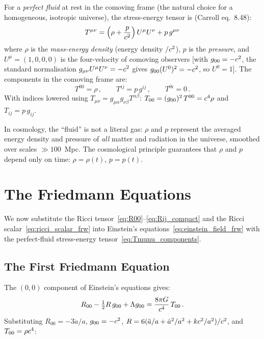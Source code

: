 For a \emph{perfect fluid} at rest in the comoving frame (the natural
choice for a homogeneous, isotropic universe), the stress-energy tensor
is (Carroll eq.~8.48):
\begin{equation}
    T^{\mu\nu} = \left(\rho + \frac{p}{c^2}\right)
    U^\mu U^\nu + p\, g^{\mu\nu}
    \label{eq:perfect_fluid_frw}
\end{equation}
where $\rho$ is the \emph{mass-energy density} (energy density
$/c^2$), $p$ is the \emph{pressure}, and
$U^\mu = (1, 0, 0, 0)$ is the four-velocity of comoving
observers [with $g_{00} = -c^2$, the standard
normalisation $g_{\mu\nu}U^\mu U^\nu = -c^2$ gives
$g_{00}(U^0)^2 = -c^2$, so $U^0 = 1$].
The components in the comoving frame are:
\begin{equation}
    T^{00} = \rho \,, \qquad
    T^{ij} = p\, g^{ij} \,, \qquad
    T^{0i} = 0 \,.
    \label{eq:Tmunu_components}
\end{equation}
With indices lowered using $T_{\mu\nu} = g_{\mu\alpha}g_{\nu\beta}T^{\alpha\beta}$:
$T_{00} = (g_{00})^2\,T^{00} = c^4\rho$ and
$T_{ij} = p\, g_{ij}$.

\begin{remark}
In cosmology, the ``fluid'' is not a literal gas: $\rho$ and $p$
represent the averaged energy density and pressure of \textit{all}
matter and radiation in the universe, smoothed over scales $\gg 100$~Mpc.
The cosmological principle guarantees that $\rho$ and $p$ depend only
on time: $\rho = \rho(t)$, $p = p(t)$.
\end{remark}


\section{The Friedmann Equations}
\label{sec:friedmann_equations}

We now substitute the Ricci tensor~\eqref{eq:R00}--\eqref{eq:Rij_compact}
and the Ricci scalar~\eqref{eq:ricci_scalar_frw} into Einstein's
equations~\eqref{eq:einstein_field_frw} with the perfect-fluid
stress-energy tensor~\eqref{eq:Tmunu_components}.

\subsection{The First Friedmann Equation}
\label{sec:friedmann_1}

The $(0,0)$ component of Einstein's equations gives:
\begin{equation}
    R_{00} - \tfrac{1}{2} R\, g_{00} + \Lambda g_{00}
    = \frac{8\pi G}{c^4}\, T_{00} \,.
    \label{eq:einstein_00}
\end{equation}
Substituting $R_{00} = -3\ddot{a}/a$,
$g_{00} = -c^2$,
$R = 6(\ddot{a}/a + \dot{a}^2/a^2 + kc^2/a^2) / c^2$,
and $T_{00} = \rho c^4$:

